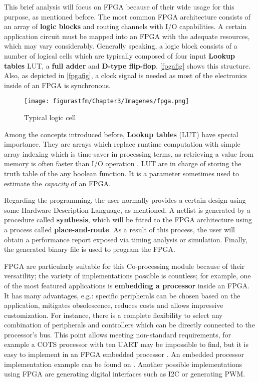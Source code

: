 This brief analysis will focus on \acrshort{FPGA} because of their wide usage for this purpose, as mentioned before. The most common \acrshort{FPGA} architecture consists of an array of \textbf{logic blocks} and routing channels with I/O capabilities. A certain application circuit must be mapped into an \acrshort{FPGA} with the adequate resources, which may vary considerably. Generally speaking, a logic block consists of a number of logical cells which are typically composed of four input \textbf{Lookup tables} \acrshort{LUT}, a \textbf{full adder} and \textbf{D-type flip-flop}. \autoref{fpgafig} shows this structure.	Also, as depicted in \autoref{fpgafig}, a clock signal is needed as most of the electronics inside of an \acrshort{FPGA} is synchronous.
 


			\begin{figure} [H] 				
				\centering
				\texttt{[image: figurastfm/Chapter3/Imagenes/fpga.png]}
				\caption{Typical logic cell \cite{wiki}} \label{fpgafig}
			\end{figure}
			
			Among the concepts introduced before, \textbf{Lookup tables} (\acrshort{LUT}) have special importance. They are arrays which replace runtime computation with simple array indexing which is time-saver in processing terms, as retrieving a value from memory is often faster than I/O operation \cite{wiki}. \acrshort{LUT} are in charge of storing the truth table of the any boolean function. It is a parameter sometimes used to estimate the \textit{capacity} of an \acrshort{FPGA}.
			
			Regarding the programming, the user normally provides a certain design using some Hardware Description Language, as mentioned. A netlist is generated by a procedure called \textbf{synthesis}, which will be fitted to the \acrshort{FPGA} architecture using a process called \textbf{place-and-route}. As a result of this process, the user will obtain a performance report exposed via timing analysis or simulation. Finally, the generated binary file is used to program the \acrshort{FPGA}.
			
		\acrshort{FPGA} are particularly suitable for this Co-processing module because of their versatility; the variety of implementations possible is countless; for example, one of the most featured applications is \textbf{embedding a processor} inside an \acrshort{FPGA}. It has many advantages, e.g.: specific peripherals can be chosen based on the application, mitigates obsolescence, reduces costs and allows impressive customization. For instance, there is a complete flexibility to select any combination of peripherals and controllers which can be directly connected to the processor's bus. This point allows meeting non-standard requirements, for example a \acrshort{COTS} processor with ten \acrshort{UART} may be impossible to find, but it is easy to implement in an \acrshort{FPGA} embedded processor \cite{fpgaproc}. An embedded processor implementation example can be found on \cite{fpgacalvo}. Another possible implementations using \acrshort{FPGA} are generating digital interfaces such as \acrshort{I2C} or generating \acrshort{PWM}.
	
